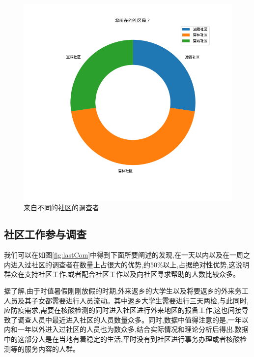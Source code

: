\documentclass[AutoFakeBold]{LZUThesis}
\begin{document}
\begin{figure}[!h]
	\centering
	\includegraphics[width=4 in]{figures/community.png}
	\caption{来自不同的社区的调查者}
	\label{fig:community}
\end{figure}

\newpage

\subsection{社区工作参与调查}
我们可以在如图\ref{fig:lastCom}中得到下面所要阐述的发现,在一天以内以及在一周之内进入过社区的调查者在数量上占很大的优势,约$50\%$以上,占据绝对性优势,这说明群众在支持社区工作,或者配合社区工作以及向社区寻求帮助的人数比较众多。

据了解,由于时值暑假刚刚放假的时期,外来返乡的大学生以及将要返乡的外来务工人员及其子女都需要进行人员流动。其中返乡大学生需要进行三天两检,与此同时,应防疫需求,需要在核酸检测的同时进入社区进行外来地区的报备工作,这也间接导致了调查人员中最近进入社区的人员数量众多。同时,数据中值得注意的是,一年以内和一年以外进入过社区的人员也为数众多,结合实际情况和理论分析后得出,数据中的这部分人是在当地有着稳定的生活,平时没有到社区进行事务办理或者核酸检测等的服务内容的人群。
\end{document}
